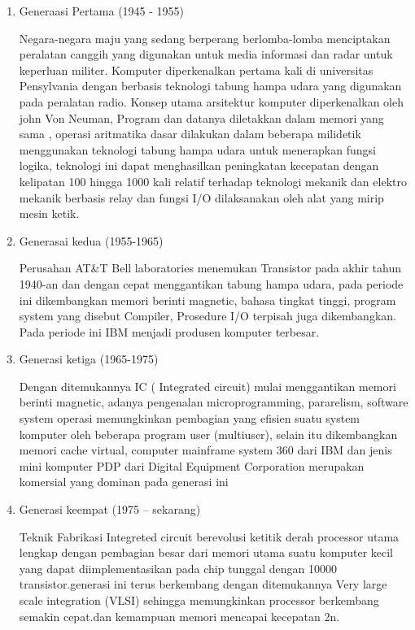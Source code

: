 \begin{enumerate}
\item Generaasi Pertama (1945 - 1955)

Negara-negara maju yang sedang berperang berlomba-lomba menciptakan peralatan canggih yang digunakan untuk media informasi dan radar  untuk keperluan militer. Komputer diperkenalkan pertama kali di universitas Pensylvania dengan berbasis teknologi tabung hampa udara  yang digunakan pada peralatan radio. Konsep utama arsitektur komputer diperkenalkan oleh john Von Neuman,
Program dan datanya diletakkan dalam memori yang sama , operasi aritmatika dasar dilakukan dalam beberapa milidetik menggunakan teknologi tabung hampa udara untuk menerapkan fungsi logika, teknologi ini dapat menghasilkan peningkatan kecepatan  dengan kelipatan 100 hingga 1000 kali relatif terhadap teknologi mekanik dan elektro mekanik berbasis relay dan  fungsi I/O dilaksanakan oleh alat yang mirip mesin ketik.

\item Generasai kedua (1955-1965)

Perusahan AT\&T Bell laboratories menemukan Transistor pada akhir tahun 1940-an dan dengan cepat menggantikan tabung hampa udara, pada  periode ini dikembangkan memori berinti magnetic, bahasa tingkat tinggi, program system yang disebut Compiler, Prosedure I/O terpisah juga dikembangkan. Pada periode ini IBM menjadi produsen komputer terbesar.

\item Generasi ketiga (1965-1975)

Dengan ditemukannya  IC ( Integrated circuit) mulai menggantikan memori berinti magnetic, adanya pengenalan microprogramming, pararelism, software system operasi memungkinkan pembagian yang efisien suatu system komputer oleh beberapa program user (multiuser), selain itu dikembangkan memori cache virtual, computer  mainframe system 360 dari IBM dan jenis mini komputer PDP dari Digital Equipment Corporation merupakan komersial yang dominan pada generasi ini

\item Generasi keempat (1975 – sekarang)

Teknik Fabrikasi Integreted circuit berevolusi  ketitik derah processor utama lengkap dengan pembagian besar dari memori utama suatu komputer kecil yang dapat diimplementasikan pada chip tunggal dengan 10000 transistor.generasi ini terus berkembang dengan ditemukannya Very large scale integration (VLSI) sehingga memungkinkan processor berkembang semakin cepat.dan kemampuan memori mencapai kecepatan 2n. 


\end{enumerate}



